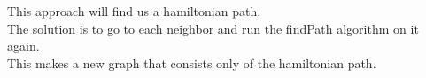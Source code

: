 \documentclass[11pt]{article}
\begin{document}
\begin{enumerate}
               This approach will find us a hamiltonian path.\\
               The solution is to go to each neighbor and run the findPath algorithm on it again. \\
               This makes a new graph that consists only of the hamiltonian path.\\

            \end{enumerate}

                                
\end{document}
